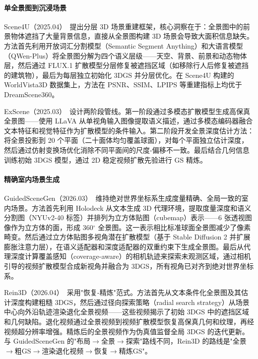 \paragraph{单全景图到沉浸场景}

Scene4U（2025.04）~\cite{2504_00387}提出分层 3D 场景重建框架，核心洞察在于：全景图中的前景物体遮挡了大量背景信息，直接从全景图构建 3D 场景会导致大面积信息缺失。方法首先利用开放词汇分割模型（Semantic Segment Anything）和大语言模型（QWen-Plus）将全景图分解为四个语义层级——天空、背景、前景和动态物体层，然后通过 FLUX.1 扩散模型分层修复被遮挡区域（如移除行人后修复被遮挡的建筑物），最后为每层独立初始化 3DGS 并分层优化。在 Scene4U 构建的 WorldVista3D 数据集上，方法在 PSNR、SSIM、LPIPS 等重建指标上均优于 DreamScene360。

ExScene（2025.03）~\cite{2503_23881}设计两阶段管线。第一阶段通过多模态扩散模型生成高保真全景图——使用 LLaVA 从单视角输入图像提取语义描述，通过多模态编码器融合文本特征和视觉特征作为扩散模型的条件输入。第二阶段开发全景深度估计方法：将全景投影到 20 个平面（二十面体均匀覆盖球面），对每个平面独立估计深度，然后通过仿射变换场优化消除不同平面间的尺度-偏移不一致。最后结合几何信息训练初始 3DGS 模型，通过 2D 稳定视频扩散先验进行 GS 精炼。

\paragraph{精确室内场景生成}

GuidedSceneGen（2026.03）~\cite{2603_13910}维持绝对世界坐标系生成度量精确、全局一致的室内场景。方法首先利用 Holodeck 从文本生成 3D 代理环境，提取度量深度和语义分割图（NYUv2-40 标签）并排列为立方体贴图（cubemap）表示——6 张透视图像作为立方体的面，形成 360$^\circ$ 全景图。这一表示相比标准球面全景图减少了像素畸变。然后通过立方体贴图多视角潜在扩散模型（基于 Stable Diffusion 2 并扩展膨胀注意力层），在语义适配器和深度适配器的双重约束下生成全景图。最后从代理深度计算覆盖感知（coverage-aware）的相机轨迹来探索未观测区域，通过相机引导的视频扩散模型合成新视角并融合为 3DGS，所有视角已对齐到绝对世界坐标系。

Rein3D（2026.04）~\cite{2604_10578}采用"恢复-精炼"范式。方法首先从文本条件化全景图及其估计深度构建粗糙 3DGS，然后通过径向探索策略（radial search strategy）从场景中心向外沿轨迹渲染退化全景视频——这些视频揭示了初始 3DGS 中的遮挡区域和几何缺陷。退化视频通过全景视频到视频扩散模型恢复高保真几何和纹理，再经视频超分辨率增强。精炼后的全景视频作为伪真值监督全局 3DGS 的迭代更新。与 GuidedSceneGen 的"布局$\rightarrow$全景$\rightarrow$探索"路线不同，Rein3D 的路线是"全景$\rightarrow$粗GS$\rightarrow$渲染退化视频$\rightarrow$恢复$\rightarrow$精炼GS"。

